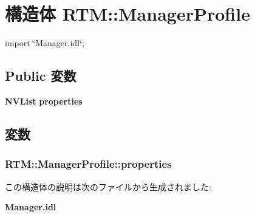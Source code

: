 \section{構造体 RTM::ManagerProfile}
\label{structRTM_1_1ManagerProfile}


{\ttfamily import \char`\"{}Manager.idl\char`\"{};}

\subsection*{Public 変数}
\begin{DoxyCompactItemize}
\item 
{\bf NVList} {\bf properties}
\end{DoxyCompactItemize}


\subsection{変数}
\subsubsection[{properties}]{ {\bf RTM::ManagerProfile::properties}}\label{structRTM_1_1ManagerProfile_af67044fc7a718c3b3d5f51527277a749}


この構造体の説明は次のファイルから生成されました:\begin{DoxyCompactItemize}
\item 
{\bf Manager.idl}\end{DoxyCompactItemize}
